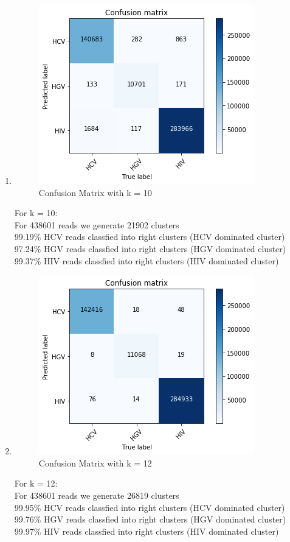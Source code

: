 \documentclass[11pt]{article}
\begin{document}
\begin{enumerate}
	\item 
	
	\begin{figure}[H]
		\centering
		\includegraphics[width = .5\textwidth]{cm_k10.png}
		\caption{Confusion Matrix with k = 10}
		\label{fig6}
	\end{figure}
	For k = 10:\\
	For 438601 reads we generate 21902 clusters\\
	99.19\% HCV reads classfied into right clusters (HCV dominated cluster)\\
	97.24\% HGV reads classfied into right clusters (HGV dominated cluster)\\
	99.37\% HIV reads classfied into right clusters (HIV dominated cluster)\\
	
	\item 
	
	\begin{figure}[H]
		\centering
		\includegraphics[width = .5\textwidth]{cm_k12.png}
		\caption{Confusion Matrix with k = 12}
		\label{fig7}
	\end{figure}
	For k = 12:\\
	For 438601 reads we generate 26819 clusters\\
	99.95\% HCV reads classfied into right clusters (HCV dominated cluster)\\
	99.76\% HGV reads classfied into right clusters (HGV dominated cluster)\\
	99.97\% HIV reads classfied into right clusters (HIV dominated cluster)\\
\end{enumerate}
\end{document}
